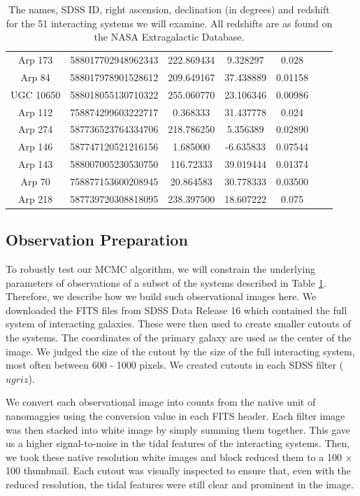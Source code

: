 \begin{table}
{\begin{tabular}{|c|c|c|c|c|c|c|}
         Arp 173 & 588017702948962343 & 222.869434 & 9.328297 & 0.028 \\
         Arp 84 & 588017978901528612 & 209.649167 & 37.438889 & 0.01158 \\
         UGC 10650 & 588018055130710322 & 255.060770 & 23.106346 & 0.00986 \\
         Arp 112 & 758874299603222717 & 0.368333 & 31.437778 & 0.024 \\
         Arp 274 & 587736523764334706 & 218.786250 & 5.356389 & 0.02890 \\
         Arp 146 & 587747120521216156 & 1.685000 & -6.635833 & 0.07544 \\
         Arp 143 & 588007005230530750 & 116.72333 & 39.019444 & 0.01374 \\
         Arp 70 & 758877153600208945 & 20.864583 & 30.778333 & 0.03500 \\
         Arp 218 & 587739720308818095 & 238.397500 & 18.607222 & 0.075 \\
         \hline
    \end{tabular}}
    \caption[The names, SDSS ID, right ascension, declination (in degrees) and redshift for the 51 interacting systems we will examine.]{The names, SDSS ID, right ascension, declination (in degrees) and redshift for the 51 interacting systems we will examine. All redshifts are as found on the NASA Extragalactic Database.}
    \label{tab:Objects}
\end{table}

\subsection{Observation Preparation}\label{data:obs-prep}
\noindent To robustly test our MCMC algorithm, we will constrain the underlying parameters of observations of a subset of the systems described in Table \ref{tab:Objects}. Therefore, we describe how we build such observational images here. We downloaded the FITS files from SDSS Data Release 16 which contained the full system of interacting galaxies. These were then used to create smaller cutouts of the systems. The coordinates of the primary galaxy are used as the center of the image. We judged the size of the cutout by the size of the full interacting system, most often between 600 - 1000 pixels. We created cutouts in each SDSS filter ($ugriz$).

We convert each observational image into counts from the native unit of nanomaggies using the conversion value in each FITS header. Each filter image was then stacked into white image by simply summing them together. This gave us a higher signal-to-noise in the tidal features of the interacting systems. Then, we took these native resolution white images and block reduced them to a 100 $\times$ 100 thumbnail. Each cutout was visually inspected to ensure that, even with the reduced resolution, the tidal features were still clear and prominent in the image.

